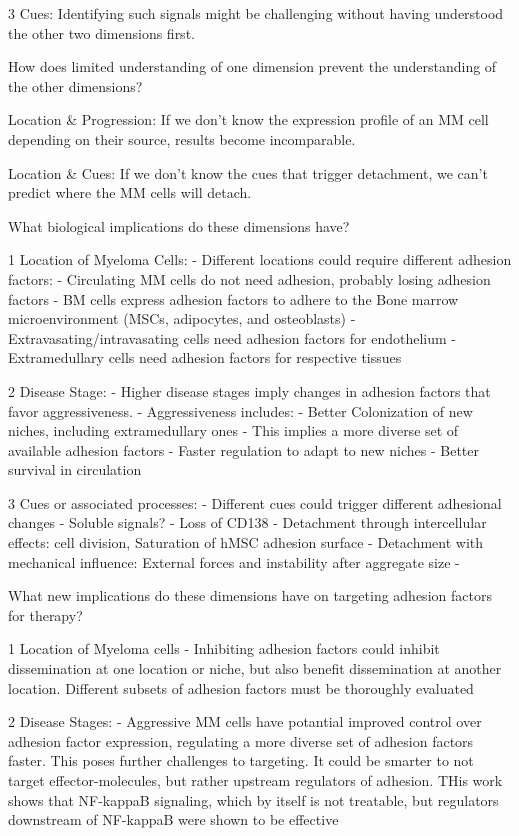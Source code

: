 3 Cues: Identifying such signals might be challenging without
having understood the other two dimensions first.


How does limited understanding of one dimension prevent the understanding of the
other dimensions?

Location \& Progression: If we don't know the expression profile of an MM cell depending on their
source, results become incomparable.

Location \& Cues: If we don't know the cues that trigger detachment, we can't
predict where the MM cells will detach.




What biological implications do these dimensions have?

1 Location of Myeloma Cells:
- Different locations could require different adhesion factors:
- Circulating MM cells do not need adhesion, probably losing adhesion factors
- BM cells express adhesion factors to adhere to the Bone marrow microenvironment (MSCs, adipocytes, and osteoblasts)
- Extravasating/intravasating cells need adhesion factors for endothelium
- Extramedullary cells need adhesion factors for respective tissues

2 Disease Stage:
- Higher disease stages imply changes in adhesion factors that favor aggressiveness.
- Aggressiveness includes:
- Better Colonization of new niches, including extramedullary ones
- This implies a more diverse set of available adhesion factors
- Faster regulation to adapt to new niches
- Better survival in circulation

3 Cues or associated processes:
- Different cues could trigger different adhesional changes
- Soluble signals?
- Loss of CD138 \cite{akhmetzyanovaDynamicCD138Surface2020}
- Detachment through intercellular effects: cell division, Saturation of hMSC adhesion surface
- Detachment with mechanical influence: External forces and instability after aggregate size
-


What new implications do these dimensions have on targeting adhesion factors for
therapy?

1 Location of Myeloma cells
- Inhibiting adhesion factors could inhibit dissemination at one location
or niche, but also benefit dissemination at another location. Different subsets
of  adhesion factors must be thoroughly evaluated


2 Disease Stages:
- Aggressive MM cells have potantial improved control over adhesion factor expression,
regulating a more diverse set of adhesion factors faster. This poses further challenges to targeting.
It could be smarter to not target effector-molecules, but rather upstream regulators of adhesion.
THis work shows that NF-kappaB signaling, which by itself is not treatable, but regulators
downstream of NF-kappaB were shown to be effective \cite{adamikEZH2HDAC1Inhibition2017,adamikXRK3F2InhibitionP62ZZ2018}

